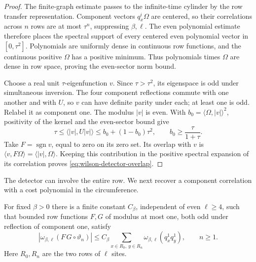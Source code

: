 \begin{proof}
The finite-graph estimate passes to the infinite-time cylinder
by the row transfer representation. Component vectors
$q_x^i\Omega$ are centered, so their correlations across $n$
rows are at most $\tau^n$, suppressing $\beta,\ell$.
The even polynomial estimate therefore places the spectral
support of every centered even polynomial vector in $[0,\tau^2]$.
Polynomials are uniformly
dense in continuous row functions, and the continuous positive
$\Omega$ has a positive minimum. Thus polynomials times $\Omega$
are dense in row space, proving the even-sector norm bound.

Choose a real unit $\tau$-eigenfunction $v$. Since
$\tau>\tau^2$, its eigenspace is odd under simultaneous inversion.
The four component reflections commute with one another and
with $U$, so $v$ can have definite parity under each; at least
one is odd. Relabel it as component one. The modulus $|v|$
is even. With $b_0=\langle\Omega,|v|\rangle^2$, positivity of
the kernel and the even-sector bound give
\[
 \tau\le\langle|v|,U|v|\rangle
       \le b_0+(1-b_0)\tau^2,
 \qquad b_0\ge\frac{\tau}{1+\tau}.
\]
Take $F=\operatorname{sgn}v$, equal to zero on its zero set.
Its overlap with $v$ is
$\langle v,F\Omega\rangle=\langle|v|,\Omega\rangle$.
Keeping this contribution in the positive spectral expansion
of its correlation proves \eqref{eq:wilson-detector-overlap}.
\end{proof}

The detector can involve the entire row. We next recover a
component correlation with a cost polynomial in the circumference.

\begin{lemma}
\label{lem:wilson-visibility}
For fixed $\beta>0$ there is a finite constant $C_\beta$,
independent of even $\ell\ge4$, such that bounded row functions
$F,G$ of modulus at most one, both odd under reflection of
component one, satisfy
\begin{equation}
 |\omega_{\beta,\ell}(F\,G\circ\vartheta_n)|
 \le C_\beta\sum_{x\in R_0,\ y\in R_n}
                      \omega_{\beta,\ell}(q_x^1q_y^1),
 \qquad n\ge1.
 \label{eq:wilson-visibility}
\end{equation}
Here $R_0,R_n$ are the two rows of $\ell$ sites.
\end{lemma}

